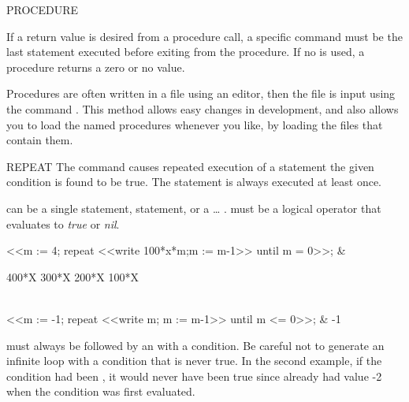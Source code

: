 \begin{Command}[procedure]{PROCEDURE}
\begin{Comments}
If a return value is desired from a procedure call, a specific
 command must be the last statement executed before exiting
from the procedure.  If no  is used, a procedure returns a
zero or no value.

Procedures are often written in a file using an editor, then the file
is input using the command .  This method allows easy changes in
development, and also allows you to load the named procedures whenever
you like, by loading the files that contain them.
\end{Comments}
\end{Command}


\begin{Command}[repeat]{REPEAT}
The  command causes repeated execution of a statement 
the given  condition is found to be true.  The statement is always executed
at least once.
\begin{Syntax}
   
\end{Syntax}

 can be a single statement,  statement, or
a \ldots{} .   must be 
a logical operator that evaluates to {\it true} or {\it nil}.

\begin{Examples}
<<m := 4; repeat <<write 100*x*m;m := m-1>> until m = 0>>;
			     & \begin{multilineoutput}{6cm}
400*X
300*X
200*X
100*X
\end{multilineoutput}\\

<<m := -1; repeat <<write m; m := m-1>> until m <= 0>>;
			     &           -1

\end{Examples}
\begin{Comments}
 must always be followed by an  with a condition.
Be careful not to generate an infinite loop with a condition that is never
true.  In the second example, if the condition had been , it
would never have been true since  already had value -2 when the
condition was first evaluated.
\end{Comments}
\end{Command}


